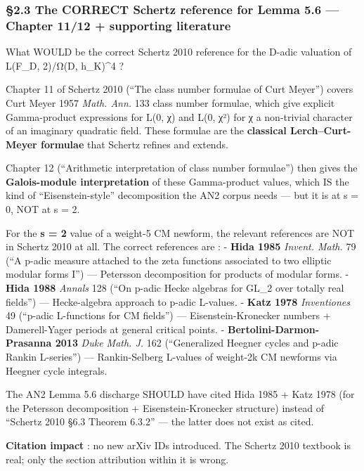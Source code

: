 \documentclass[
  11pt,
  a4paper,
]{article}
\begin{document}
\hypertarget{the-correct-schertz-reference-for-lemma-5.6-chapter-1112-supporting-literature}{%
\subsubsection{§2.3 The CORRECT Schertz reference for Lemma 5.6 --- Chapter 11/12 + supporting literature}\label{the-correct-schertz-reference-for-lemma-5.6-chapter-1112-supporting-literature}}

What WOULD be the correct Schertz 2010 reference for the \textbar D\textbar-adic valuation of L(F\_D, 2)/Ω(D, h\_K)\^{}4 ?

Chapter 11 of Schertz 2010 (``The class number formulae of Curt Meyer'') covers Curt Meyer 1957 \emph{Math. Ann.} 133 class number formulae, which give explicit Gamma-product expressions for L(0, χ) and L(0, χ²) for χ a non-trivial character of an imaginary quadratic field. These formulae are the \textbf{classical Lerch--Curt-Meyer formulae} that Schertz refines and extends.

Chapter 12 (``Arithmetic interpretation of class number formulae'') then gives the \textbf{Galois-module interpretation} of these Gamma-product values, which IS the kind of ``Eisenstein-style'' decomposition the AN2 corpus needs --- but it is at s = 0, NOT at s = 2.

For the \textbf{s = 2} value of a weight-5 CM newform, the relevant references are NOT in Schertz 2010 at all. The correct references are :
- \textbf{Hida 1985} \emph{Invent. Math.} 79 (``A p-adic measure attached to the zeta functions associated to two elliptic modular forms I'') --- Petersson decomposition for products of modular forms.
- \textbf{Hida 1988} \emph{Annals} 128 (``On p-adic Hecke algebras for GL\_2 over totally real fields'') --- Hecke-algebra approach to p-adic L-values.
- \textbf{Katz 1978} \emph{Inventiones} 49 (``p-adic L-functions for CM fields'') --- Eisenstein-Kronecker numbers + Damerell-Yager periods at general critical points.
- \textbf{Bertolini-Darmon-Prasanna 2013} \emph{Duke Math. J.} 162 (``Generalized Heegner cycles and p-adic Rankin L-series'') --- Rankin-Selberg L-values of weight-2k CM newforms via Heegner cycle integrals.

The AN2 Lemma 5.6 discharge SHOULD have cited Hida 1985 + Katz 1978 (for the Petersson decomposition + Eisenstein-Kronecker structure) instead of ``Schertz 2010 §6.3 Theorem 6.3.2'' --- the latter does not exist as cited.

\textbf{Citation impact} : no new arXiv IDs introduced. The Schertz 2010 textbook is real; only the section attribution within it is wrong.
\end{document}

